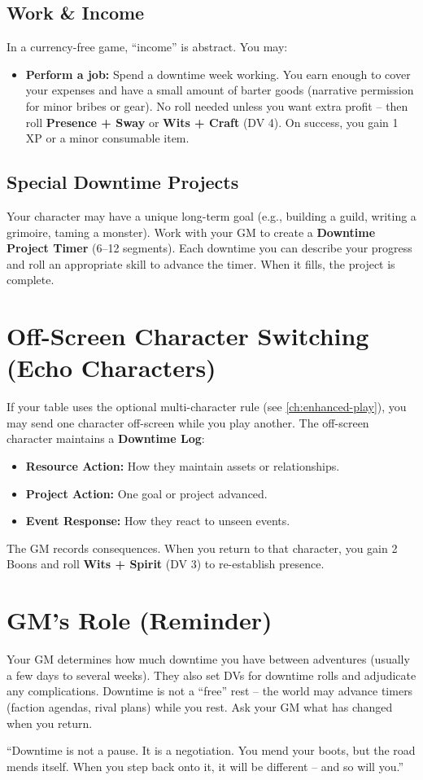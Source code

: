 \subsection{Work \& Income}
In a currency-free game, ``income'' is abstract. You may:
\begin{itemize}
  \item \textbf{Perform a job:} Spend a downtime week working. You earn enough to cover your expenses and have a small amount of barter goods (narrative permission for minor bribes or gear). No roll needed unless you want extra profit -- then roll \textbf{Presence + Sway} or \textbf{Wits + Craft} (DV 4). On success, you gain 1 XP or a minor consumable item.
\end{itemize}

\subsection{Special Downtime Projects}
Your character may have a unique long-term goal (e.g., building a guild, writing a grimoire, taming a monster). Work with your GM to create a \textbf{Downtime Project Timer } (6--12 segments). Each downtime you can describe your progress and roll an appropriate skill to advance the timer. When it fills, the project is complete.

\section{Off-Screen Character Switching (Echo Characters)}
If your table uses the optional multi-character rule (see \ref{ch:enhanced-play}), you may send one character off-screen while you play another. The off-screen character maintains a \textbf{Downtime Log}:
\begin{itemize}
  \item \textbf{Resource Action:} How they maintain assets or relationships.
  \item \textbf{Project Action:} One goal or project advanced.
  \item \textbf{Event Response:} How they react to unseen events.
\end{itemize}
The GM records consequences. When you return to that character, you gain 2 Boons and roll \textbf{Wits + Spirit} (DV 3) to re-establish presence.

\section{GM's Role (Reminder)}
Your GM determines how much downtime you have between adventures (usually a few days to several weeks). They also set DVs for downtime rolls and adjudicate any complications. Downtime is not a ``free'' rest -- the world may advance timers (faction agendas, rival plans) while you rest. Ask your GM what has changed when you return.

\begin{tcolorbox}[colback=green!5!white,colframe=green!70!black,title=The Gray Wanderer's Advice,breakable]
``Downtime is not a pause. It is a negotiation. You mend your boots, but the road mends itself. When you step back onto it, it will be different -- and so will you.''
\end{tcolorbox}